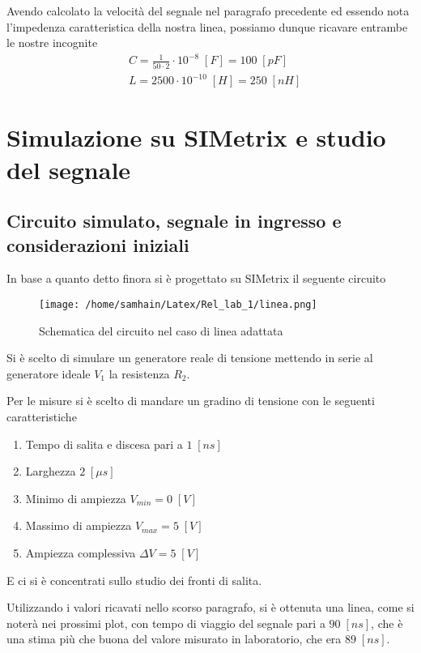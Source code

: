 \documentclass[]{report}
\begin{document}
Avendo calcolato la velocità del segnale nel paragrafo precedente ed essendo nota l'impedenza caratteristica della nostra linea, possiamo dunque ricavare entrambe le nostre incognite
\begin{align}
&C = \frac{1}{50 \cdot 2} \cdot 10^{-8} \; [F] = 100 \; [pF]\\
&L = 2500 \cdot  10^{-10} \; [H] = 250 \; [nH]
\end{align}



\newpage


\section{Simulazione su SIMetrix e studio del segnale}

\subsection{Circuito simulato, segnale in ingresso e considerazioni iniziali}
In base a quanto detto finora si è progettato su SIMetrix il seguente circuito
\begin{figure}[!htb]
	\centering
	\texttt{[image: /home/samhain/Latex/Rel\_lab\_1/linea.png]}
	\label{ergwg}
	\caption{\label{luegregegl} \small Schematica del circuito nel caso di linea adattata}
\end{figure}

Si è scelto di simulare un generatore reale di tensione mettendo in serie al generatore ideale $V_1$ la resistenza $R_2$.

Per le misure si è scelto di mandare un gradino di tensione con le seguenti caratteristiche
\begin{enumerate}
	\item Tempo di salita e discesa pari a $1 \; [ns]$
	\item Larghezza $2 \; [\mu s]$
	\item Minimo di ampiezza $V_{min} = 0 \; [V]$
	\item Massimo di ampiezza $V_{max} = 5 \; [V]$
	\item Ampiezza complessiva  $\Delta V= 5 \; [V]$
\end{enumerate}

E ci si è concentrati sullo studio dei fronti di salita.

Utilizzando i valori ricavati nello scorso paragrafo, si è ottenuta una linea, come si noterà nei prossimi plot, con tempo di viaggio del segnale pari a $90 \; [ns]$, che è una stima più che buona del valore misurato in laboratorio, che era  $89 \; [ns]$.
\end{document}
